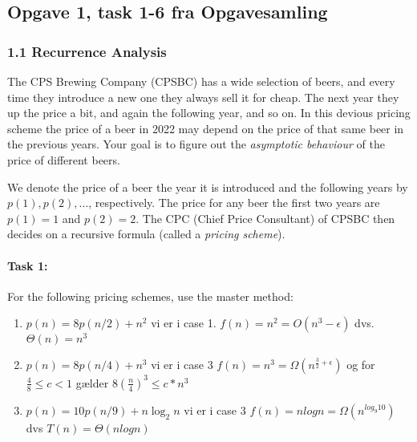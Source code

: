 \documentclass{article}
\theoremstyle{definition}
\begin{document}
\subsection{Opgave 1, task 1-6 fra Opgavesamling}

\subsubsection{1.1 Recurrence Analysis}
The CPS Brewing Company (CPSBC) has a wide selection of beers, and every time they introduce a new one they always sell it for cheap. The next year they up the price a bit, and again the following year, and so on. In this devious pricing scheme the price of a beer in 2022 may depend on the price of that same beer in the previous years. Your goal is to figure out the \textit{asymptotic behaviour} of the price of different beers.

We denote the price of a beer the year it is introduced and the following years by $p(1),p(2),\ldots$, respectively. The price for any beer the first two years are $p(1)=1$ and $p(2)=2$. The CPC (Chief Price Consultant) of CPSBC then decides on a recursive formula (called a \textit{pricing scheme}).

\paragraph{Task 1:} For the following pricing schemes, use the master method:
\begin{enumerate}
    \item $p(n) = 8p(n/2) + n^2$ vi er i case 1. $f(n) = n^2 = O(n^3-\epsilon)$ dvs. $\Theta(n) = n^3$
    \item $p(n) = 8p(n/4) + n^3$ vi er i case 3  $f(n) = n^3 = \Omega(n^{\frac{3}{2} + \epsilon})$ og for $\frac{4}{8} \leq  c < 1$ gælder $8(\frac{n}{4})^3 \leq c*n^3$
    \item $p(n) = 10p(n/9) + n\log_2 n$ vi er i case 3 $f(n) = nlogn = \Omega(n^{log_{9}10})$ dvs $T(n) = \Theta(n log n)$
\end{enumerate}
\end{document}
